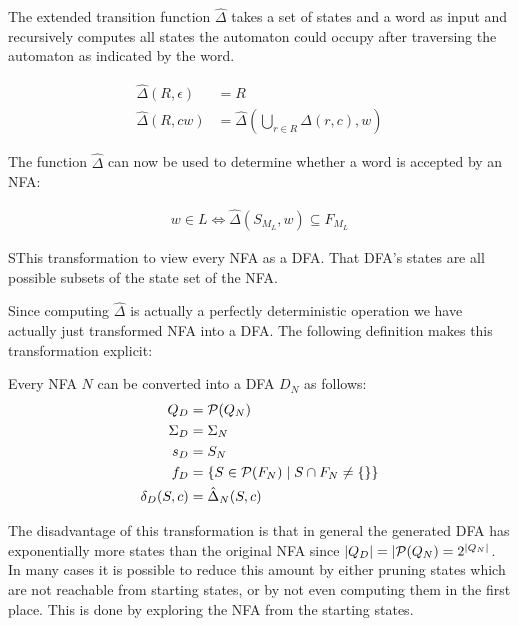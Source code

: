 \begin{definition}
    The extended transition function $\hat\Delta$ takes a set of states and a
    word as input and recursively computes all states the automaton could occupy
    after traversing the automaton as indicated by the word.

    \begin{align}
        \hat\Delta(R, \epsilon) &= R \\
        \hat\Delta(R, c w) &= \hat\Delta(\bigcup\limits_{r \in R} \Delta(r, c), w)
    \end{align}
\end{definition}

The function $\hat\Delta$ can now be used to determine whether a word is accepted by an NFA:

\begin{align}
    w \in L \Leftrightarrow \hat\Delta(S_{M_L}, w) \subseteq F_{M_L}
\end{align}

SThis transformation to view every NFA as a DFA.
That DFA's states are all possible subsets of the state set of the NFA.

Since computing $\hat\Delta$ is actually a perfectly deterministic operation
we have actually just transformed NFA into a DFA.
The following definition makes this transformation explicit:

\begin{definition}
    Every NFA $N$ can be converted into a DFA $D_N$ as follows:
    \begin{align}
        Q_D &= \mathcal{P}(Q_N) \\
        \Sigma_D &= \Sigma_N \\
        s_D &= S_N \\
        f_D &= \{ S \in \mathcal{P}(F_N) \mid S \cap F_N \neq \{\} \} \\
        \delta_D(S, c) &= \hat\Delta_N(S, c)
    \end{align}
\end{definition}

The disadvantage of this transformation is that
in general the generated DFA has exponentially more states
than the original NFA since $|Q_D| = |\mathcal{P}(Q_N) = 2^{|Q_N|}$.
In many cases it is possible to reduce this amount by either pruning states
which are not reachable from starting states,
or by not even computing them in the first place.
This is done by exploring the NFA from the starting states.
